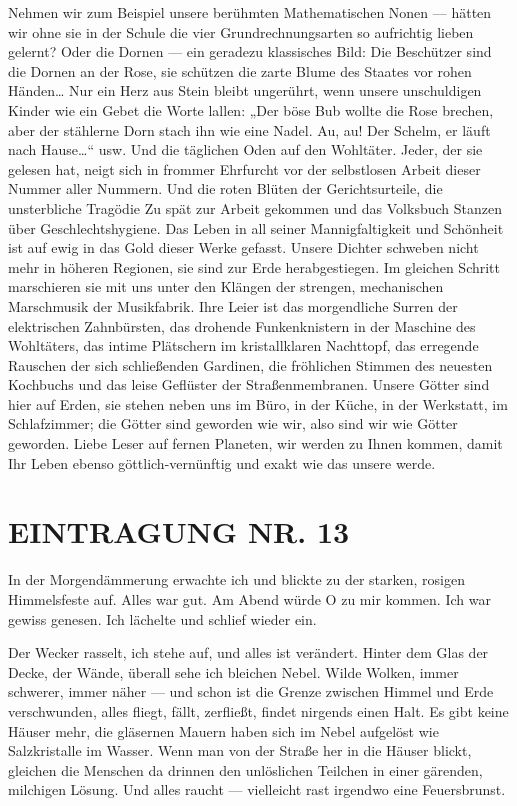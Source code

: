 Nehmen wir zum Beispiel unsere berühmten Mathematischen Nonen —
hätten wir ohne sie in der Schule die vier Grundrechnungsarten so
aufrichtig lieben gelernt? Oder die Dornen — ein geradezu
klassisches Bild: Die Beschützer sind die Dornen an der Rose, sie
schützen die zarte Blume des Staates vor rohen Händen\ldots{} Nur ein
Herz aus Stein bleibt ungerührt, wenn unsere unschuldigen Kinder
wie ein Gebet die Worte lallen: „Der böse Bub wollte die Rose
brechen, aber der stählerne Dorn stach ihn wie eine Nadel. Au, au!
Der Schelm, er läuft nach Hause\ldots{}“ usw. Und die täglichen Oden auf
den Wohltäter. Jeder, der sie gelesen hat, neigt sich in frommer
Ehrfurcht vor der selbstlosen Arbeit dieser Nummer aller Nummern.
Und die roten Blüten der Gerichtsurteile, die unsterbliche Tragödie
Zu spät zur Arbeit gekommen und das Volksbuch Stanzen über
Geschlechtshygiene. Das Leben in all seiner Mannigfaltigkeit und
Schönheit ist auf ewig in das Gold dieser Werke gefasst. Unsere
Dichter schweben nicht mehr in höheren Regionen, sie sind zur Erde
herabgestiegen. Im gleichen Schritt marschieren sie mit uns unter
den Klängen der strengen, mechanischen Marschmusik der Musikfabrik.
Ihre Leier ist das morgendliche Surren der elektrischen
Zahnbürsten, das drohende Funkenknistern in der Maschine des
Wohltäters, das intime Plätschern im kristallklaren Nachttopf, das
erregende Rauschen der sich schließenden Gardinen, die fröhlichen
Stimmen des neuesten Kochbuchs und das leise Geflüster der
Straßenmembranen. Unsere Götter sind hier auf Erden, sie stehen
neben uns im Büro, in der Küche, in der Werkstatt, im Schlafzimmer;
die Götter sind geworden wie wir, also sind wir wie Götter
geworden. Liebe Leser auf fernen Planeten, wir werden zu Ihnen
kommen, damit Ihr Leben ebenso göttlich-vernünftig und exakt wie
das unsere werde.

\section{EINTRAGUNG NR. 13}

In der Morgendämmerung erwachte ich und blickte zu der starken,
rosigen Himmelsfeste auf. Alles war gut. Am Abend würde O zu mir
kommen. Ich war gewiss genesen. Ich lächelte und schlief wieder
ein.

Der Wecker rasselt, ich stehe auf, und alles ist verändert. Hinter
dem Glas der Decke, der Wände, überall sehe ich bleichen Nebel.
Wilde Wolken, immer schwerer, immer
näher — und schon ist die Grenze zwischen Himmel und Erde
verschwunden, alles fliegt, fällt, zerfließt, findet nirgends einen
Halt. Es gibt keine Häuser mehr, die gläsernen Mauern haben sich im
Nebel aufgelöst wie Salzkristalle im Wasser. Wenn man von der
Straße her in die Häuser blickt, gleichen die Menschen da drinnen
den unlöslichen Teilchen in einer gärenden, milchigen Lösung. Und
alles raucht — vielleicht rast irgendwo eine Feuersbrunst.

